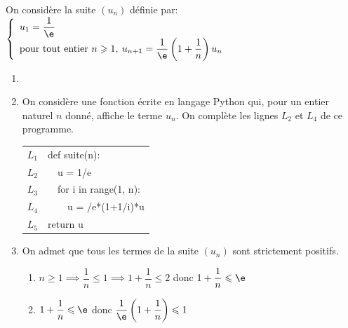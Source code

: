 
\medskip

On considère la suite $\left(u_{n}\right)$ définie par: 
$\left\{
\begin{array}{l}
u_{1}=\dfrac{1}{\e} \\
\text{pour tout entier } n \geqslant 1,\: u_{n+1}=\dfrac{1}{\e}\left(1+\dfrac{1}{n}\right) u_{n}
\end{array}
\right.$

\begin{enumerate}
	\item %

	\item On considère une fonction écrite en langage Python qui, pour un entier naturel $n$ donné, affiche le terme $u_{n}$. On complète les lignes $L_{2}$ et $L_{4}$ de ce programme.

	\begin{center}
		\begin{tabular}{|c|>{\ttfamily}l|}
			\hline
			$L_{1}$ & def suite(n): \\
			$L_{2}$ & ~~\blue u = 1/e \\
			$L_{3}$ & ~~for i in range(1, n): \\
			$L_{4}$ & ~~~~u = \blue 1/e*(1+1/i)*u\\
			$L_{5}$ & return u \\
			\hline
		\end{tabular}
	\end{center}

	\item On admet que tous les termes de la suite $\left(u_{n}\right)$ sont strictement positifs.
	\begin{enumerate}
		\item %
$n\geqslant 1 \implies \dfrac{1}{n}\leqslant 1 \implies 1+\dfrac{1}{n}\leqslant 2$ donc $1+\dfrac{1}{n}\leqslant \e$

		\item %
$1+\dfrac{1}{n}\leqslant \e$ donc $\dfrac{1}{\e} \left (1+\dfrac{1}{n}\right )\leqslant 1$


\end{enumerate}
\end{enumerate}
